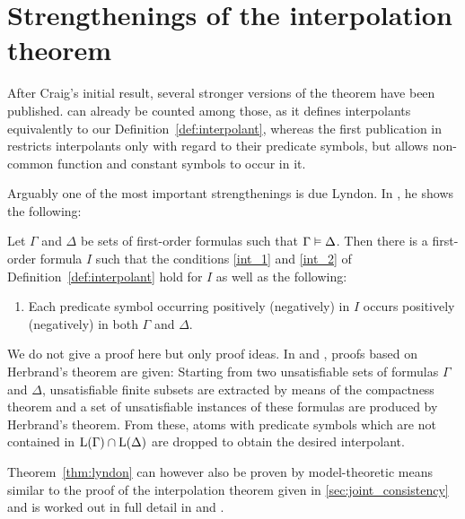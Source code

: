 \section{Strengthenings of the interpolation theorem}
\label{sec:strengthenings}

After Craig's initial result, several stronger versions of the theorem have been published.
\cite{Craig57three} can already be counted among those,
as it defines interpolants equivalently to our Definition~\ref{def:interpolant}, 
whereas the first publication in \cite{Craig57linear} restricts interpolants only with regard to their predicate symbols, but allows non-common function and constant symbols to occur in it.


Arguably one of the most important strengthenings is due Lyndon. In \cite{lyndon59}, he shows the following:

\begin{thm}[Lyndon]
	\label{thm:lyndon}
Let $\Gamma$ and $\Delta$ be sets of first-order formulas such that $\Gamma \entails\nolinebreak \Delta$. 
Then there is a first-order formula $I$ such that the conditions \ref{int_1} and \ref{int_2} of Definition~\ref{def:interpolant} hold for $I$ as well as the following:
\begin{enumerate}
		\renewcommand{\theenumi}{\arabic{enumi}'}
		\setcounter{enumi}{2}
	\item Each predicate symbol occurring positively (negatively) in $I$ occurs positively (negatively) in both $\Gamma$ and $\Delta$.
		\label{int_lyndon_3}
\end{enumerate}
\end{thm}

We do not give a proof here but only proof ideas.
In \cite{lyndon59} and \cite{slagle70}, proofs based on Herbrand's theorem are given:
Starting from two unsatisfiable sets of formulas $\Gamma$ and $\Delta$, unsatisfiable finite subsets are extracted by means of the compactness theorem and a set of unsatisfiable instances of these formulas are produced by Herbrand's theorem.
From these, atoms with predicate symbols which are not contained in $\operatorname{L}(\Gamma) \cap \operatorname{L}(\Delta)$ are dropped to obtain the desired interpolant.

Theorem~\ref{thm:lyndon} can however also be proven by model-theoretic means similar to the proof of the interpolation theorem given in \ref{sec:joint_consistency}
and is worked out in full detail in \cite{Henkin63} and \cite[Theorem\ 2.2.24]{chang1990model}.


